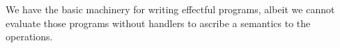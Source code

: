 \documentclass[12pt,phd,lfcs,twoside,openright,logo,leftchapter,normalheadings]{infthesis}
\theoremstyle{plain}
\theoremstyle{definition}
\begin{document}
We have the basic machinery for writing effectful programs, albeit we
cannot evaluate those programs without handlers to ascribe a semantics
to the operations.



\end{document}
